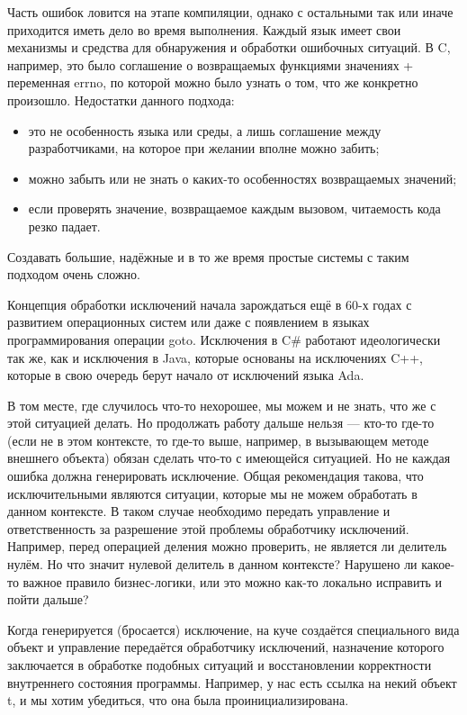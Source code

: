 \documentclass[a5paper]{article}
\begin{document}
Часть ошибок ловится на этапе компиляции, однако с остальными так или иначе приходится иметь дело во время выполнения. Каждый язык имеет свои механизмы и средства для обнаружения и обработки ошибочных ситуаций. В C, например, это было соглашение о возвращаемых функциями значениях + переменная errno, по которой можно было узнать о том, что же конкретно произошло. Недостатки данного подхода:

\begin{itemize}
    \item это не особенность языка или среды, а лишь соглашение между разработчиками, на которое при желании вполне можно забить;
    \item можно забыть или не знать о каких-то особенностях возвращаемых значений;
    \item если проверять значение, возвращаемое каждым вызовом, читаемость кода резко падает.
\end{itemize}

Создавать большие, надёжные и в то же время простые системы с таким подходом очень сложно.

Концепция обработки исключений начала зарождаться ещё в 60-х годах с развитием операционных систем или даже с появлением в языках программирования операции goto. Исключения в C\# работают идеологически так же, как и исключения в Java, которые основаны на исключениях C++, которые в свою очередь берут начало от исключений языка Ada.

В том месте, где случилось что-то нехорошее, мы можем и не знать, что же с этой ситуацией делать. Но продолжать работу дальше нельзя --- кто-то где-то (если не в этом контексте, то где-то выше, например, в вызывающем методе внешнего объекта) обязан сделать что-то с имеющейся ситуацией. Но не каждая ошибка должна генерировать исключение. Общая рекомендация такова, что исключительными являются ситуации, которые мы не можем обработать в данном контексте. В таком случае необходимо передать управление и ответственность за разрешение этой проблемы обработчику исключений. Например, перед операцией деления можно проверить, не является ли делитель нулём. Но что значит нулевой делитель в данном контексте? Нарушено ли какое-то важное правило бизнес-логики, или это можно как-то локально исправить и пойти дальше?

Когда генерируется (бросается) исключение, на куче создаётся специального вида объект и управление передаётся обработчику исключений, назначение которого заключается в обработке подобных ситуаций и восстановлении корректности внутреннего состояния программы. Например, у нас есть ссылка на некий объект t, и мы хотим убедиться, что она была проинициализирована.
\end{document}
